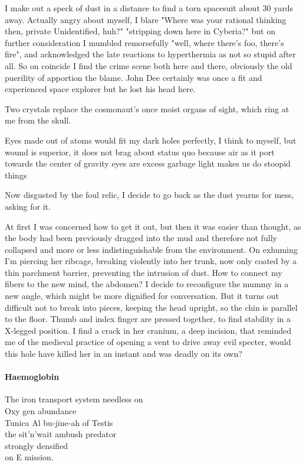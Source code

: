 \documentclass{article}
\begin{document}
I make out a speck of dust in a distance to find a
torn spacesuit about 30 yards away. Actually angry about myself, I blare 
"Where was your rational thinking then, private Unidentified, huh?"
"stripping down here in Cyberia?"
but on further consideration I mumbled remorsefully
"well, where there's foo, there's fire", and acknowledged
the late reactions to hyperthermia as not so stupid after all. 
So on coincide I find the crime scene both here and there, 
obviously the old puerility of apportion the blame. 
John Dee certainly was once a fit and experienced space explorer
but he lost his head here.

Two crystals replace the cosmonaut's once moist organs of sight, 
which ring at me from the skull. 

Eyes made out of atoms would fit my dark holes perfectly, I think to myself,
but wound is superior, it does not brag about status quo
because air
as it port towards the center of gravity 
eyes are excess garbage
light makes us do stoopid things

Now disgusted by the foul relic, 
I decide to go back as the dust yearns for mess, asking for it. 

At first I was concerned how to get it out, 
but then it was easier than thought, 
as the body had been previously dragged into the mud and therefore
not fully collapsed and more or less
indistinguishable from the environment.
On exhuming I'm 
piercing her ribcage, breaking violently into her
trunk, now only coated by a thin parchment
barrier, preventing the intrusion of dust.
How to connect my fibers to the new mind, the abdomen?
I decide to reconfigure the mummy in a new angle, 
which might be more dignified for conversation. 
But it turns out difficult not to break into pieces,
keeping the head upright, so the chin is parallel to the floor.
Thumb and index finger are pressed together,
to find stability in a X-legged position. 
I find a crack in her cranium, 
a deep incision, 
that reminded me of the medieval practice of opening a vent to drive away evil specter, would this hole have killed her in an instant and
was deadly on its own?


\paragraph{Haemoglobin}
The iron transport system
needless on \\
Oxy gen abundance \\
Tunica Al \″bu-jin\´e-ah of Testis \\
 the sit'n'wait ambush predator \\
strongly densified \\
on E mission. \\
\end{document}
